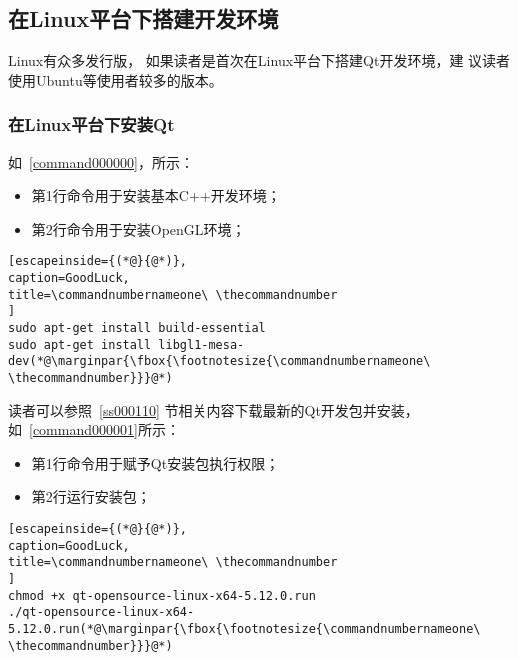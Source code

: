 ﻿




%

\FloatBarrier
\subsection{
在Linux平台下搭建开发环境
}\label{s000210}


Linux有众多发行版，
如果读者是首次在Linux平台下搭建Qt开发环境，建
议读者使用Ubuntu等使用者较多的版本。

\FloatBarrier
\subsubsection{
在Linux平台下安装Qt
}\label{ss000410}



如\commandnumbernameone\ \ref{command000000}，所示：

\begin{itemize}
\item 第1行命令用于安装基本C{\sourcefonttwo{}+}{\sourcefonttwo{}+}开发环境；
\item 第2行命令用于安装OpenGL环境；
\end{itemize}

{}\label{command000000}    %
\begin{lstlisting}[escapeinside={(*@}{@*)},
caption=GoodLuck,
title=\commandnumbernameone\ \thecommandnumber
]
sudo apt-get install build-essential
sudo apt-get install libgl1-mesa-dev(*@\marginpar{\fbox{\footnotesize{\commandnumbernameone\ \thecommandnumber}}}@*)\end{lstlisting}          %


读者可以参照\ \ref{ss000110}
节相关内容下载最新的Qt开发包并安装，如\commandnumbernameone\ \ref{command000001}所示：

\begin{itemize}
\item 第1行命令用于赋予Qt安装包执行权限；
\item 第2行运行安装包；
\end{itemize}

{}\label{command000001}    %
\begin{lstlisting}[escapeinside={(*@}{@*)},
caption=GoodLuck,
title=\commandnumbernameone\ \thecommandnumber
]
chmod +x qt-opensource-linux-x64-5.12.0.run
./qt-opensource-linux-x64-5.12.0.run(*@\marginpar{\fbox{\footnotesize{\commandnumbernameone\ \thecommandnumber}}}@*)\end{lstlisting}          %


